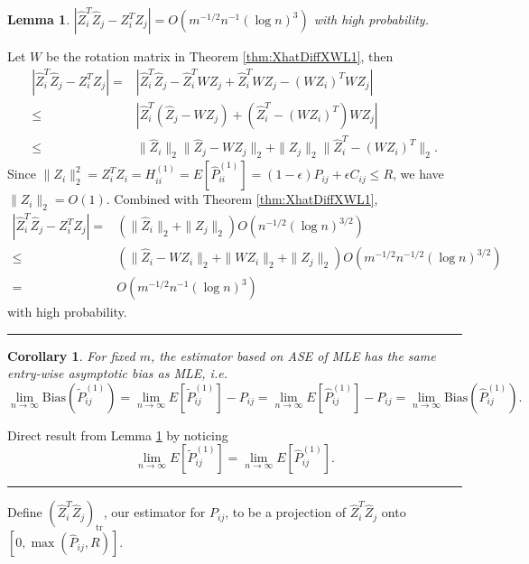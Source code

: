 \documentclass[a4paper]{article}
\newenvironment{proof}{{\bf Proof:  }}{\hfill\rule{2mm}{2mm}}
\newtheorem{lemma}[fact]{Lemma}
\newtheorem{corollary}[fact]{Corollary}
\begin{document}
\begin{lemma}
\label{lemma:1stMomentPhatDiffL1}
$\left|  \hat{Z}_i^T \hat{Z}_j - Z_i^T Z_j \right| = O(m^{-1/2} n^{-1} (\log n)^{3})$ with high probability.
\end{lemma}
\begin{proof}
Let $W$ be the rotation matrix in Theorem \ref{thm:XhatDiffXWL1}, then
\begin{align*}
	\left|  \hat{Z}_i^T \hat{Z}_j - Z_i^T Z_j \right|
    = & \left| \hat{Z}_i^T \hat{Z}_j - \hat{Z}_i^T W Z_j + \hat{Z}_i^T W Z_j - (W Z_i)^T W Z_j \right| \\
    \le & \left| \hat{Z}_i^T (\hat{Z}_j - W Z_j) + (\hat{Z}_i^T - (W Z_i)^T) W Z_j \right| \\
    \le & \|\hat{Z}_i\|_2 \|\hat{Z}_j - W Z_j\|_2 + \|Z_j\|_2 \|\hat{Z}_i^T - (W Z_i)^T\|_2.
\end{align*}
Since $\|Z_i\|_2^2 = Z_i^T Z_i = H^{(1)}_{ii} =  E[\hat{P}^{(1)}_{ii}] = (1-\epsilon) P_{ij} + \epsilon C_{ij} \le R$, we have $\|Z_i\|_2 = O(1)$.
Combined with Theorem \ref{thm:XhatDiffXWL1},
\begin{align*}
    \left|  \hat{Z}_i^T \hat{Z}_j - Z_i^T Z_j \right|
    = & (\|\hat{Z}_i\|_2 + \|Z_j\|_2) O(n^{-1/2} (\log n)^{3/2}) \\
    \le & (\|\hat{Z}_i - W Z_i\|_2 + \|W Z_i\|_2 + \|Z_j\|_2) O(m^{-1/2} n^{-1/2} (\log n)^{3/2}) \\
    = & O(m^{-1/2} n^{-1} (\log n)^{3})
\end{align*}
with high probability.
\end{proof}




\begin{corollary}
\label{cor:L1Consistent}
For fixed $m$, the estimator based on ASE of MLE has the same entry-wise asymptotic bias as MLE, i.e.
\[
	\lim_{n \to \infty} \mathrm{Bias}(\widetilde{P}_{ij}^{(1)}) = \lim_{n \to \infty} E[\widetilde{P}_{ij}^{(1)}] - P_{ij} = \lim_{n \to \infty} E[\hat{P}^{(1)}_{ij}] - P_{ij}
    = \lim_{n \to \infty} \mathrm{Bias}(\hat{P}_{ij}^{(1)}).
\]
\end{corollary}
\begin{proof}
Direct result from Lemma \ref{lemma:1stMomentPhatDiffL1} by noticing
\[
	\lim_{n \to \infty} E[\widetilde{P}_{ij}^{(1)}] = \lim_{n \to \infty} E[\hat{P}^{(1)}_{ij}].
\]
\end{proof}


Define $(\hat{Z}_i^T \hat{Z}_j)_{\mathrm{tr}}$, our estimator for $P_{ij}$, to be a projection of $\hat{Z}_i^T \hat{Z}_j$ onto $[0, \max(\hat{P}_{ij}, R)]$.
\end{document}
